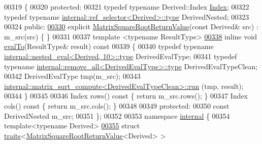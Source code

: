 \begin{DoxyCode}
00319 \{
00320   \textcolor{keyword}{protected}:
00321     \textcolor{keyword}{typedef} \textcolor{keyword}{typename} Derived::Index \hyperlink{namespace_eigen_a62e77e0933482dafde8fe197d9a2cfde}{Index};
00322     \textcolor{keyword}{typedef} \textcolor{keyword}{typename} \hyperlink{class_eigen_1_1internal_1_1_tensor_lazy_evaluator_writable}{internal::ref\_selector<Derived>::type} 
      DerivedNested;
00323 
00324   \textcolor{keyword}{public}:
\hyperlink{class_eigen_1_1_matrix_square_root_return_value_aa27fd0e59ff1711a55ee8a4342c035d5}{00330}     \textcolor{keyword}{explicit} \hyperlink{class_eigen_1_1_matrix_square_root_return_value_aa27fd0e59ff1711a55ee8a4342c035d5}{MatrixSquareRootReturnValue}(\textcolor{keyword}{const} Derived& src) : m\_src(src) \{ \}
00331 
00337     \textcolor{keyword}{template} <\textcolor{keyword}{typename} ResultType>
\hyperlink{class_eigen_1_1_matrix_square_root_return_value_a97577165569edcf19429c7748b670e51}{00338}     \textcolor{keyword}{inline} \textcolor{keywordtype}{void} \hyperlink{class_eigen_1_1_matrix_square_root_return_value_a97577165569edcf19429c7748b670e51}{evalTo}(ResultType& result)\textcolor{keyword}{ const}
00339 \textcolor{keyword}{    }\{
00340       \textcolor{keyword}{typedef} \textcolor{keyword}{typename} \hyperlink{class_eigen_1_1internal_1_1_tensor_lazy_evaluator_writable}{internal::nested\_eval<Derived, 10>::type} 
      DerivedEvalType;
00341       \textcolor{keyword}{typedef} \textcolor{keyword}{typename} \hyperlink{group___sparse_core___module}{internal::remove\_all<DerivedEvalType>::type}
       DerivedEvalTypeClean;
00342       DerivedEvalType tmp(m\_src);
00343       \hyperlink{struct_eigen_1_1internal_1_1matrix__sqrt__compute_a29c137f6d7c0cbe4df034be5aed427f6}{internal::matrix\_sqrt\_compute<DerivedEvalTypeClean>::run}
      (tmp, result);
00344     \}
00345 
00346     Index rows()\textcolor{keyword}{ const }\{ \textcolor{keywordflow}{return} m\_src.rows(); \}
00347     Index cols()\textcolor{keyword}{ const }\{ \textcolor{keywordflow}{return} m\_src.cols(); \}
00348 
00349   \textcolor{keyword}{protected}:
00350     \textcolor{keyword}{const} DerivedNested m\_src;
00351 \};
00352 
00353 \textcolor{keyword}{namespace }\hyperlink{namespaceinternal}{internal} \{
00354 \textcolor{keyword}{template}<\textcolor{keyword}{typename} Derived>
\hyperlink{struct_eigen_1_1internal_1_1traits_3_01_matrix_square_root_return_value_3_01_derived_01_4_01_4}{00355} \textcolor{keyword}{struct }\hyperlink{struct_eigen_1_1internal_1_1traits}{traits}<\hyperlink{class_eigen_1_1_matrix_square_root_return_value}{MatrixSquareRootReturnValue}<Derived> >

\end{DoxyCode}
